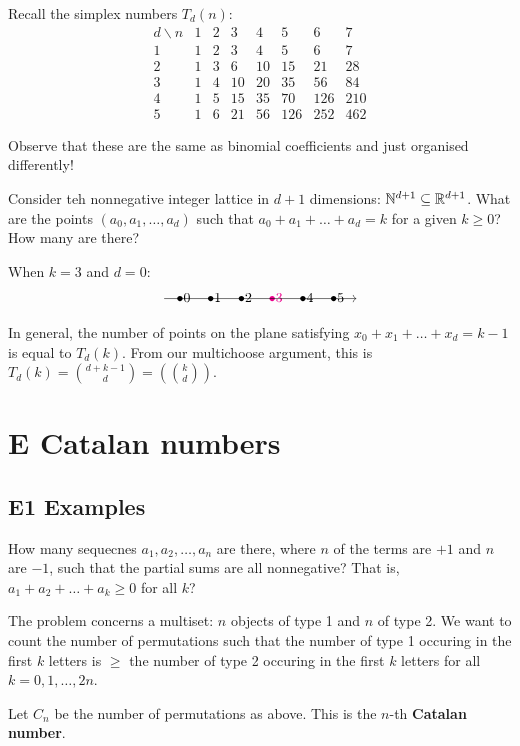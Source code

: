 \documentclass[12pt]{article}
\begin{document}
Recall the simplex numbers $T_d(n)$:
$$
\begin{array}{cccccccc}
d\backslash n & 1 & 2 & 3 & 4 & 5 & 6 & 7 \\
1 & 1 & 2 & 3 & 4 & 5 & 6 & 7 \\
2 & 1 & 3 & 6 & 10 & 15 & 21 & 28 \\
3 & 1 & 4 & 10 & 20 & 35 & 56 & 84 \\
4 & 1 & 5 & 15 & 35 & 70 & 126 & 210 \\
5 & 1 & 6 & 21 & 56 & 126 & 252 & 462
\end{array}
$$

Observe that these are the same as binomial coefficients and just organised differently!

Consider teh nonnegative integer lattice in $d+1$ dimensions: $\mathbb{N}^{d+1}\subseteq \mathbb{R}^{d+1}$. What are the points $(a_0,a_1,\dots,a_d)$ such that $a_0+a_1+\dots+a_d=k$ for a given $k\geq 0$? How many are there?

\eg When $k=3$ and $d=0$:
\[\begin{tikzcd}[ampersand replacement=\&,cramped,sep=tiny]
	{} \& {\bullet 0} \& {\bullet 1} \& \bullet2 \& \rt{\bullet3} \& \bullet4 \& \bullet5 \& {}
	\arrow[from=1-1, to=1-8]
\end{tikzcd}\]

In general, the number of points on the plane satisfying $x_0+x_1+\dots + x_d=k-1$ is equal to $T_d(k)$. From our multichoose argument, this is $T_d(k)={d+k-1\choose d}=\left({k\choose d}\right)$.

\section{E Catalan numbers}

\subsection{E1 Examples}
\eg How many sequecnes $a_1,a_2,\dots,a_n$ are there, where $n$ of the terms are $+1$ and $n$ are $-1$, such that the partial sums are all nonnegative? That is, $a_1+a_2+\dots+a_k\geq 0$ for all $k$?

The problem concerns a multiset: $n$ objects of type 1 and $n$ of type 2. We want to count the number of permutations such that the number of type 1 occuring in the first $k$ letters is $\geq $ the number of type 2 occuring in the first $k$ letters for all $k=0,1,\dots,2n$. 

 Let $C_n$ be the number of permutations as above. This is the $n$-th \textbf{Catalan number}.
\end{document}

